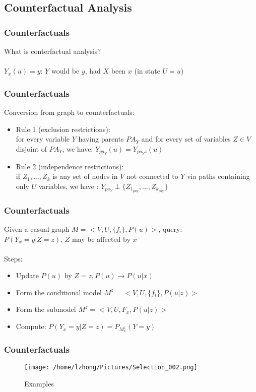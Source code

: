 \documentclass{beamer}
\begin{document}
\subsection{Counterfactual Analysis}
\begin{frame}
\frametitle{Counterfactuals}
What is conterfactual analysis?
\\~\\
$Y_x(u) = y$: $Y$ would be $y$, had $X$ been $x$ (in state $U=u$)
\end{frame}

\begin{frame}
\frametitle{Counterfactuals}
Conversion from graph to counterfactuals:
\begin{itemize}
\item Rule 1 (exclusion restrictions):\\
		for every variable $Y$ having parents $PA_Y$ and for every set of variables $Z \in V$
		disjoint of $PA_Y$, we have:
		$Y_{pa_Y}(u) = Y_{pa_Yz}(u)$
\item Rule 2 (independence restrictions):\\
		if $Z_1,...,Z_k$ is any set of nodes in $V$ not connected to $Y$ via paths containing
		only $U$ variables, we have :
		$Y_{pa_Y} \perp \{Z_{1_{pa_Y}},...,Z_{k_{pa_Y}}\}$\\
\end{itemize}
\end{frame}

\begin{frame}
\frametitle{Counterfactuals}
Given a casual graph $M = <V,U,\{f_i\},P(u) >$, query:\\
$P(Y_x = y|Z=z)$, $Z$ may be affected by $x$
\\~\\
Steps:\\ 
\begin{itemize}
\item Update $P(u)$ by $Z=z, P(u) \to P(u|x)$
\item Form the conditional model $M^z = <V,U,\{f_i\},P(u|z) >$
\item Form the submodel $M^z = <V,U,F_x,P(u|z) >$
\item Compute: $P(Y_x = y|Z=z) = P_{M_x^z}(Y=y)$
\end{itemize}
\end{frame}


\begin{frame}
\frametitle{Counterfactuals}
\begin{figure}
\texttt{[image: /home/lzhong/Pictures/Selection\_002.png]}
\caption{Examples}
\end{figure}
\end{frame}
\end{document}
